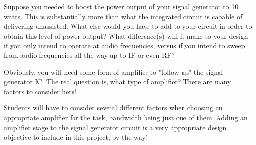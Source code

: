 

Suppose you needed to boost the power output of your signal generator to 10 watts.  This is substantially more than what the integrated circuit is capable of delivering unassisted.  What else would you have to add to your circuit in order to obtain this level of power output?  What difference(s) will it make to your design if you only intend to operate at audio frequencies, versus if you intend to sweep from audio frequencies all the way up to IF or even RF?







Obviously, you will need some form of amplifier to "follow up" the signal generator IC.  The real question is, what type of amplifier?  There are many factors to consider here!







Students will have to consider several different factors when choosing an appropriate amplifier for the task, bandwidth being just one of them.  Adding an amplifier stage to the signal generator circuit is a very appropriate design objective to include in this project, by the way!



